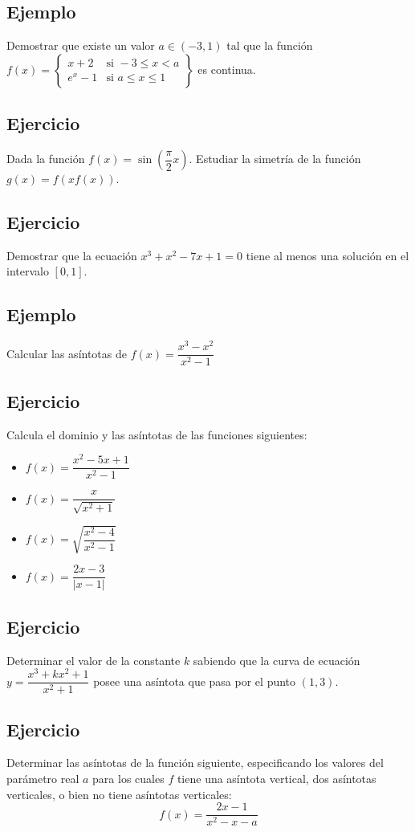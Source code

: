 \documentclass[10pt, a4paper]{article}
\begin{document}
\subsection{Ejemplo}
\label{sec:orgf499bd4}
Demostrar que existe un valor \(a \in (-3,1)\) tal que la función \(f(x) = \left\{\begin{array}{cc} {x+2} & \text{si } -3 \leq x < a \\ e^x - 1 & \text{si } a \leq x \leq 1  \end{array}\right\}\) es continua.
\subsection{Ejercicio}
\label{sec:org33003ec}
Dada la función \(f(x) = \sin\left(\dfrac{\pi}{2}x\right)\). Estudiar la simetría de la función \(g(x) = f\left(x f(x)\right)\).
\subsection{Ejercicio}
\label{sec:org8090482}
Demostrar que la ecuación \(x^3+x^2-7x+1=0\) tiene al menos una solución en el intervalo \([0,1]\).
\subsection{Ejemplo}
\label{sec:org9d120fd}
Calcular las asíntotas de \(f(x)=\dfrac{x^3-x^2}{x^2-1}\)
\subsection{Ejercicio}
\label{sec:org90b7fae}
Calcula el dominio y las asíntotas de las funciones siguientes:

\begin{itemize}
\item \(f(x)=\dfrac{x^2-5x+1}{x^2-1}\)
\item \(f(x)=\dfrac{x}{\sqrt{x^2+1}}\)
\item \(f(x)=\sqrt{\dfrac{x^2-4}{x^2-1}}\)
\item \(f(x)=\dfrac{2x-3}{|x-1|}\)
\end{itemize}
\subsection{Ejercicio}
\label{sec:org7be2d20}
Determinar el valor de la constante \(k\) sabiendo que la curva de ecuación \(y=\dfrac{x^3+kx^2+1}{x^2+1}\) posee una asíntota que pasa por el punto \((1,3)\).
\subsection{Ejercicio}
\label{sec:orgb0c1f17}
Determinar las asíntotas de la función siguiente, especificando los valores del parámetro real \(a\) para los cuales \(f\) tiene una asíntota vertical, dos asíntotas verticales, o bien no tiene asíntotas verticales:
\[f(x)=\dfrac{2x-1}{x^2-x-a}\]
\end{document}

